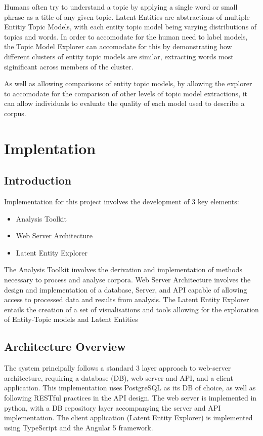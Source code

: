 \documentclass[10pt]{report}
\begin{document}
Humans often try to understand a topic by applying a single word or small phrase as a title of any given topic. Latent Entities are abstractions of multiple Entitiy Topic Models, with each entity topic model being varying distributions of topics and words. In order to accomodate for the human need to label models, the Topic Model Explorer can accomodate for this by demonstrating how different clusters of entity topic models are similar, extracting words most siginificant across members of the cluster.

As well as allowing comparisons of entity topic models, by allowing the explorer to accomodate for the comparison of other levels of topic model extractions, it can allow individuals to evaluate the quality of each model used to describe a corpus.

%
%
%
%
%
\chapter{Implentation}
\section{Introduction}
\renewcommand{\baselinestretch}{0.5}\normalsize
Implementation for this project involves the development of 3 key elements:
\begin{itemize}
\item Analysis Toolkit
\item Web Server Architecture
\item Latent Entity Explorer
\end{itemize}
\renewcommand{\baselinestretch}{2.0}\normalsize

The Analysis Toolkit involves the derivation and implementation of methods necessary to process and analyse corpora. Web Server Architecture involves the design and implementation of a database, Server, and API capable of allowing access to processed data and results from analysis. The Latent Entity Explorer entails the creation of a set of visualisations and tools allowing for the exploration of Entity-Topic models and Latent Entities
\section{Architecture Overview}
The system principally follows a standard 3 layer approach to web-server architecture, requiring a database (DB), web server and API, and a client application. This implementation uses PostgreSQL as its DB of choice, as well as following RESTful practices in the API design. The web server is implemented in python, with a DB repository layer accompanying the server and API implementation. The client application (Latent Entity Explorer) is implemented using TypeScript and the Angular 5 framework.
\end{document}
